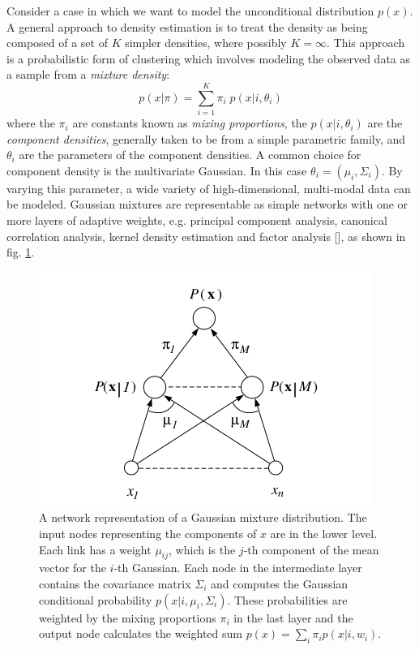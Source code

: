 Consider a case in which we want to model the unconditional distribution $p(x)$. A general approach to density estimation is to treat the density as being composed of a set of $K$ simpler densities, where possibly $K=\infty$. This approach is a probabilistic form of clustering which involves modeling the observed data as a sample from a \textit{mixture density}:
$$p(x|\pi) = \sum_{i=1}^{K} \pi_i \; p(x|i, \theta_i)$$
where the $\pi_i$ are constants known as \textit{mixing proportions}, the $p(x|i, \theta_i)$ are the \textit{component densities}, generally taken to be from a simple parametric family, and $\theta_i$ are the parameters of the component densities. A common choice for component density is the multivariate Gaussian. In this case $\theta_i = (\mu_i, \Sigma_i)$. By varying this parameter, a wide variety of high-dimensional, multi-modal data can be modeled. Gaussian mixtures are representable as simple networks with one or more layers of adaptive weights, e.g. principal component analysis, canonical correlation analysis, kernel density estimation and factor analysis [\cite{Polson2017}], as shown in fig. \ref{fig:gaussianmix}. 
\begin{figure}
    \centering
    \includegraphics[scale=0.5]{images/gaussianmix.png}
    \caption{A network representation of a Gaussian mixture distribution. The input nodes representing the components of $x$ are in the lower level. Each link has a weight $\mu_{ij}$, which is the $j$-th component of the mean vector for the $i$-th Gaussian. Each node in the intermediate layer contains the covariance matrix $\Sigma_i$ and computes the Gaussian conditional probability $p(x|i,\mu_i,\Sigma_i)$. These probabilities are weighted by the mixing proportions $\pi_i$ in the last layer and the output node calculates the weighted sum $p(x) = \sum_i \pi_i p(x|i, w_i)$.}
    \label{fig:gaussianmix}
\end{figure}
